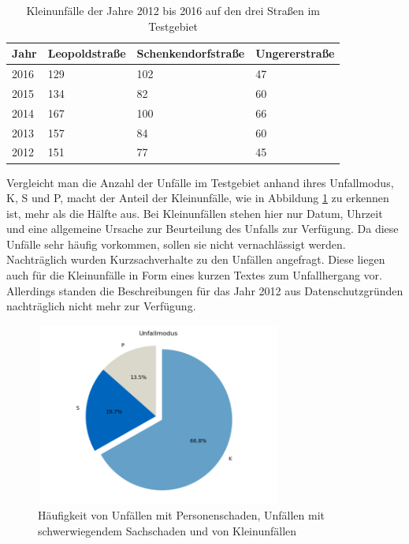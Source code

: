 \begin{table}[htpb]
	\scriptsize
	\caption[Kleinunfälle der Jahre 2012 bis 2016 auf den drei Straßen im Testgebiet]{Kleinunfälle der Jahre 2012 bis 2016 auf den drei Straßen im Testgebiet}\label{tab:Kleinunfälle}
	\centering
	\begin{tabular}{l  l l p{2cm}}
		\toprule
		Jahr & Leopoldstraße & Schenkendorfstraße & Ungererstraße \\
		\midrule
		2016 & 129 & 102 & 47\\
		2015 & 134 & 82 & 60\\
		2014 & 167 & 100 & 66\\
		2013 & 157 & 84 & 60\\
		2012 & 151 & 77 & 45\\
		\bottomrule
	\end{tabular}
\end{table}

Vergleicht man die Anzahl der Unfälle im Testgebiet anhand ihres Unfallmodus, \acf{K}, \acf{S} und \acf{P}, macht der Anteil der Kleinunfälle, wie in Abbildung \ref{fig:Unfallmodus} zu erkennen ist, mehr als die Hälfte aus. Bei Kleinunfällen stehen hier nur Datum, Uhrzeit und eine allgemeine Ursache zur Beurteilung des Unfalls zur Verfügung. Da diese Unfälle sehr häufig vorkommen, sollen sie nicht vernachlässigt werden. Nachträglich wurden Kurzsachverhalte zu den Unfällen angefragt. Diese liegen auch für die Kleinunfälle in  Form eines kurzen Textes zum Unfallhergang vor. Allerdings standen die Beschreibungen für das Jahr 2012 aus Datenschutzgründen nachträglich nicht mehr zur Verfügung.

\begin{savenotes}
	\begin{figure}[H]
		\centering
		\includegraphics[width=8.1cm,height=6cm]{figures/Unfallmodus}
		\caption[Häufigkeit des Unfallmoduses]{Häufigkeit von Unfällen mit Personenschaden, Unfällen mit schwerwiegendem Sachschaden und von Kleinunfällen}\label{fig:Unfallmodus}
	\end{figure}
\end{savenotes}

